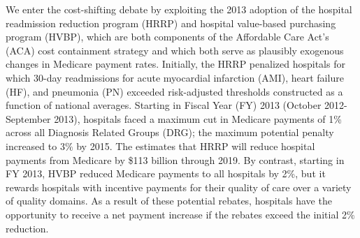 \documentclass[12pt]{article}
\begin{document}
We enter the cost-shifting debate by exploiting the 2013 adoption of the hospital readmission reduction program (HRRP) and hospital value-based purchasing program (HVBP), which are both components of the Affordable Care Act's (ACA) cost containment strategy and which both serve as plausibly exogenous changes in Medicare payment rates.  Initially, the HRRP penalized hospitals for which 30-day readmissions for acute myocardial infarction (AMI), heart failure (HF), and pneumonia (PN) exceeded risk-adjusted thresholds constructed as a function of national averages.  Starting in Fiscal Year (FY) 2013 (October 2012-September 2013), hospitals faced a maximum cut in Medicare payments of 1\% across all Diagnosis Related Groups (DRG); the maximum potential penalty increased to 3$\%$ by 2015.  The \cite{cbo2010} estimates that HRRP will reduce hospital payments from Medicare by \$113 billion through 2019.  By contrast, starting in FY 2013, HVBP reduced Medicare payments to all hospitals by 2\%, but it rewards hospitals with incentive payments for their quality of care over a variety of quality domains. As a result of these potential rebates, hospitals have the opportunity to receive a net payment increase if the rebates exceed the initial 2$\%$ reduction.
\end{document}
